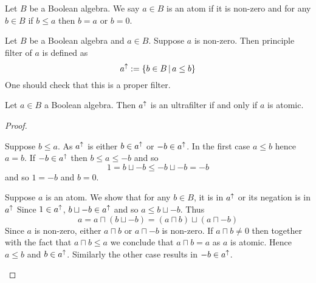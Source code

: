 \begin{dfn}[Atom]
    Let $B$ be a Boolean algebra. 
    We say $a \in B$ is an atom if it is non-zero and for any $b \in B$
    if $b \leq a$ then $b = a$ or $b = 0$.
\end{dfn}

\begin{dfn}
    Let $B$ be a Boolean algebra and $a \in B$.
    Suppose $a$ is non-zero.
    Then principle filter of $a$ is defined as 
    \[a^{\uparrow} := \left\{b \in B \,|\, a \leq b\right\}\]
    One should check that this is a proper filter.
\end{dfn}

\begin{prop}
    Let $a \in B$ a Boolean algebra.
    Then $a^{\uparrow}$ is an ultrafilter if and only if $a$ is atomic. 
\end{prop}
\begin{proof}
    \begin{forward}
        Suppose $b \leq a$.
        As $a^{\uparrow}$ is  
        either $b \in a^{\uparrow}$ or $- b \in a^{\uparrow}$.
        In the first case $a \leq b$ hence $a = b$.
        If $- b \in a^{\uparrow}$ then $b \leq a \leq - b$ and so 
        \[1 = b \sqcup - b \leq - b \sqcup - b = - b\]
        and so $1 = - b$ and $b = 0$.
    \end{forward}

    \begin{backward}
        Suppose $a$ is an atom. 
        We show that for any $b \in B$, 
        it is in $a^{\uparrow}$ or its negation is in $a^{\uparrow}$
        Since $1 \in a^{\uparrow}$, 
        $b \sqcup - b \in a^{\uparrow}$ and so $a \leq b \sqcup - b$.
        Thus
        \[a = a \sqcap (b \sqcup - b) = (a \sqcap b) \sqcup (a \sqcap - b)\]
        Since $a$ is non-zero, either $a \sqcap b$ or $a \sqcap - b$ is non-zero.
        If $a \sqcap b \ne 0$ then together with the fact that $a \sqcap b \leq a$
        we conclude that $a \sqcap b = a$ as $a$ is atomic.
        Hence $a \leq b$ and $b \in a^{\uparrow}$.
        Similarly the other case results in $- b \in a^{\uparrow}$.
    \end{backward}
\end{proof}

